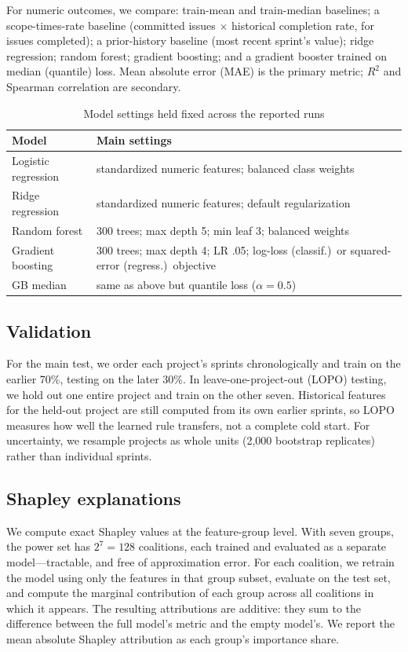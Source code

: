 \documentclass[conference]{IEEEtran}
\begin{document}
For numeric outcomes, we compare: train-mean and train-median baselines; a scope-times-rate baseline (committed issues $\times$ historical completion rate, for issues completed); a prior-history baseline (most recent sprint's value); ridge regression; random forest; gradient boosting; and a gradient booster trained on median (quantile) loss.
Mean absolute error (MAE) is the primary metric; $R^2$ and Spearman correlation are secondary.

\begin{table}[!htb]
\centering\scriptsize
\caption{Model settings held fixed across the reported runs}
\label{tab:settings}
\setlength{\tabcolsep}{2.4pt}
\begin{tabular}{@{}p{1.65cm}p{5.1cm}@{}}
\toprule
Model & Main settings\\
\midrule
Logistic regression & standardized numeric features; balanced class weights\\
Ridge regression & standardized numeric features; default regularization\\
Random forest & 300 trees; max depth 5; min leaf 3; balanced weights\\
Gradient boosting & 300 trees; max depth 4; LR .05; log-loss (classif.)\ or squared-error (regress.)\ objective\\
GB median & same as above but quantile loss ($\alpha = 0.5$)\\
\bottomrule
\end{tabular}
\end{table}

\subsection{Validation}
For the main test, we order each project's sprints chronologically and train on the earlier 70\%, testing on the later 30\%.
In leave-one-project-out (LOPO) testing, we hold out one entire project and train on the other seven.
Historical features for the held-out project are still computed from its own earlier sprints, so LOPO measures how well the learned rule transfers, not a complete cold start.
For uncertainty, we resample projects as whole units (2,000 bootstrap replicates) rather than individual sprints.

\subsection{Shapley explanations}
We compute exact Shapley values at the feature-group level.
With seven groups, the power set has $2^7 = 128$ coalitions, each trained and evaluated as a separate model---tractable, and free of approximation error.
For each coalition, we retrain the model using only the features in that group subset, evaluate on the test set, and compute the marginal contribution of each group across all coalitions in which it appears.
The resulting attributions are additive: they sum to the difference between the full model's metric and the empty model's.
We report the mean absolute Shapley attribution as each group's importance share.
\end{document}

